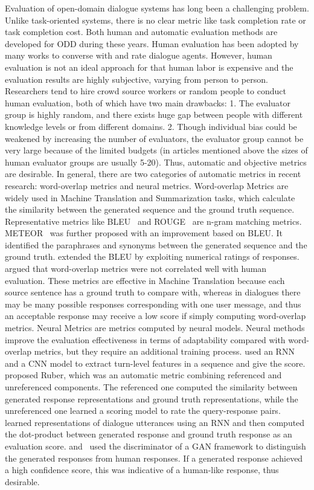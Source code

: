 \label{Evaluation Methods for Open-domain Dialogue Systems}
Evaluation of open-domain dialogue systems has long been a challenging problem. Unlike task-oriented systems, there is no clear metric like task completion rate or task completion cost. Both human and automatic evaluation methods are developed for ODD during these years. Human evaluation has been adopted by many works  to converse with and rate dialogue agents. However, human evaluation is not an ideal approach for that human labor is expensive and the evaluation results are highly subjective, varying from person to person. Researchers tend to hire crowd source workers  or random people  to conduct human evaluation, both of which have two main drawbacks: 1. The evaluator group is highly random, and there exists huge gap between people with different knowledge levels or from different domains. 2. Though individual bias could be weakened by increasing the number of evaluators, the evaluator group cannot be very large because of the limited budgets (in articles mentioned above the sizes of human evaluator groups are usually 5-20). Thus, automatic and objective metrics are desirable. In general, there are two categories of automatic metrics in recent research: word-overlap metrics and neural metrics. 
Word-overlap Metrics are widely used in Machine Translation and Summarization tasks, which calculate the similarity between the generated sequence and the ground truth sequence. Representative metrics like BLEU~ and ROUGE~ are n-gram matching metrics. METEOR~ was further proposed with an improvement based on BLEU. It identified the paraphrases and synonyms between the generated sequence and the ground truth.  extended the BLEU by exploiting numerical ratings of responses.  argued that word-overlap metrics were not correlated well with human evaluation. These metrics are effective in Machine Translation because each source sentence has a ground truth to compare with, whereas in dialogues there may be many possible responses corresponding with one user message, and thus an acceptable response may receive a low score if simply computing word-overlap metrics. 
Neural Metrics are metrics computed by neural models. Neural methods improve the evaluation effectiveness in terms of adaptability compared with word-overlap metrics, but they require an additional training process.  used an RNN and a CNN model to extract turn-level features in a sequence and give the score.  proposed Ruber, which was an automatic metric combining referenced and unreferenced components. The referenced one computed the similarity between generated response representations and ground truth representations, while the unreferenced one learned a scoring model to rate the query-response pairs.  learned representations of dialogue utterances using an RNN and then computed the dot-product between generated response and ground truth response as an evaluation score.  and~ used the discriminator of a GAN framework to distinguish the generated responses from human responses. If a generated response achieved a high confidence score, this was indicative of a human-like response, thus desirable. 
